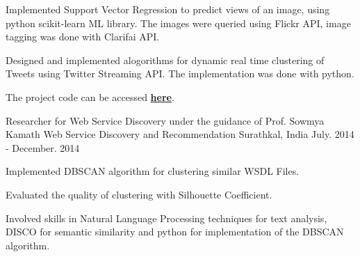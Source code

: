 \begin{cventries}
{\begin{cvitems}
        \item {Implemented Support Vector Regression to predict views of an image, using python scikit-learn ML library. The images were queried using Flickr API, image tagging was done with Clarifai API.}
        \item {Designed and implemented alogorithms for dynamic real time clustering of Tweets using Twitter Streaming API. The implementation was done with python.}
        \item {The project code can be accessed \href{https://github.com/varun93/social-multimedia-popularity}{\textbf{here}}.}
      \end{cvitems} 
    }
 \cventry
   {Researcher for Web Service Discovery under the guidance of Prof. Sowmya Kamath}
    {Web Service Discovery and Recommendation}
    {Surathkal, India}
    {July. 2014 - December. 2014}
    {
     \begin{cvitems}
     \item {Implemented DBSCAN algorithm for clustering similar WSDL Files.}
     \item  {Evaluated the quality of clustering with Silhouette Coefficient.}
     \item {Involved skills in Natural Language Processing techniques for text analysis, DISCO for semantic similarity and python for implementation of the DBSCAN algorithm.}
     \end{cvitems} 
    }
\end{cventries}
